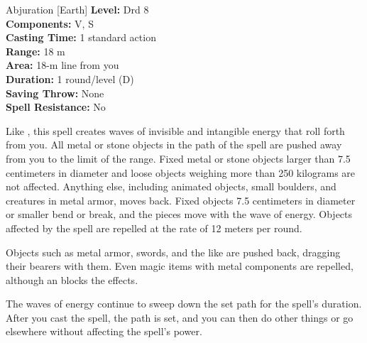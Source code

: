 {Abjuration [Earth]}
{
	\textbf{Level:}
	Drd 8\\
	\textbf{Components:}
	V, S\\
	\textbf{Casting Time:}
	1 standard action\\
	\textbf{Range:}
	18 m\\
	\textbf{Area:}
	18-m line from you\\
	\textbf{Duration:}
	1 round/level (D)\\
	\textbf{Saving Throw:}
	None\\
	\textbf{Spell Resistance:}
	No\\
}
{
	Like , this spell creates waves of invisible and intangible energy that roll forth from you. All metal or stone objects in the path of the spell are pushed away from you to the limit of the range. Fixed metal or stone objects larger than 7.5 centimeters in diameter and loose objects weighing more than 250 kilograms are not affected. Anything else, including animated objects, small boulders, and creatures in metal armor, moves back. Fixed objects 7.5 centimeters in diameter or smaller bend or break, and the pieces move with the wave of energy. Objects affected by the spell are repelled at the rate of 12 meters per round.

	Objects such as metal armor, swords, and the like are pushed back, dragging their bearers with them. Even magic items with metal components are repelled, although an  blocks the effects.

	The waves of energy continue to sweep down the set path for the spell's duration. After you cast the spell, the path is set, and you can then do other things or go elsewhere without affecting the spell's power.

}

